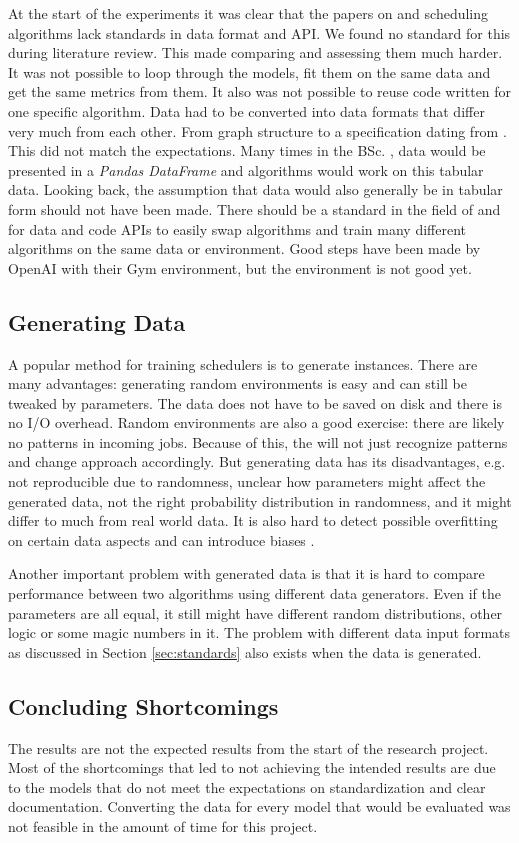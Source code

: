 At the start of the experiments it was clear that the papers on \rl and
scheduling algorithms lack standards in data format and API. We found no
standard for this during literature review. This made comparing and assessing
them much harder. It was not possible to loop through the models, fit them on
the same data and get the same metrics from them. It also was not possible to
reuse code written for one specific algorithm. Data had to be converted into
data formats that differ very much from each other. From graph structure to a
specification dating from . This did not match the
expectations. Many times in the BSc. \ai, data would be presented in a
\textit{Pandas DataFrame} and algorithms would work on this tabular data.
Looking back, the assumption that \jss data would also generally be in tabular
form should not have been made. There should be a standard in the field of \rl
and \jss for data and code APIs to easily swap \rl algorithms and train many
different \rl algorithms on the same data or environment. Good steps have been
made by OpenAI with their Gym environment, but the \jss environment is not
good yet.


\subsection{Generating Data}

A popular method for training \ai schedulers is to generate instances. There
are many advantages: generating random environments is easy and can still be
tweaked by parameters. The data does not have to be saved on disk and there is
no I/O overhead. Random environments are also a good exercise: there are
likely no patterns in incoming jobs. Because of this, the \ai will not just
recognize patterns and change approach accordingly. But generating data has
its disadvantages, e.g. not reproducible due to randomness, unclear how
parameters might affect the generated data, not the right probability
distribution in randomness, and it might differ to much from real world data.
It is also hard to detect possible overfitting on certain data aspects and can
introduce biases \cite{hall2001}.

Another important problem with generated data is that it is hard to compare
performance between two algorithms using different data generators. Even if
the parameters are all equal, it still might have different random
distributions, other logic or some magic numbers in it. The problem with
different data input formats as discussed in Section \ref{sec:standards} also
exists when the data is generated.


\subsection{Concluding Shortcomings}

The results are not the expected results from the start of the research
project. Most of the shortcomings that led to not achieving the intended
results are due to the models that do not meet the expectations on
standardization and clear documentation. Converting the data for every model
that would be evaluated was not feasible in the amount of time for this
project.

